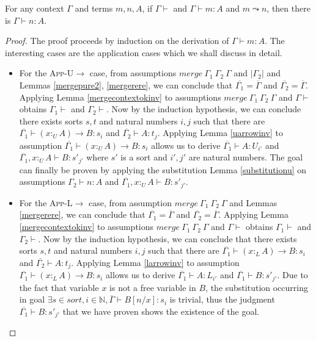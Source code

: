 \documentclass[sigplan,screen,review,anonymous]{acmart}
\newcommand{\rname}[1]{\textsc{\footnotesize #1}}
\newcommand{\pure}[1]{|#1|}
\newcommand{\utype}{:_{\scriptscriptstyle U}}
\newcommand{\ltype}{:_{\scriptscriptstyle L}}
\newcommand{\step}{\leadsto}
\newcommand{\mrg}[3]{merge\ {#1}\ {#2}\ {#3}}
\begin{document}
\begin{theorem}
  For any context $\Gamma$ and terms $m, n, A$, if $\Gamma \vdash$ and $\Gamma \vdash m : A$ and $m \step n$, then there is $\Gamma \vdash n : A$.
\end{theorem}
\begin{proof}
  The proof proceeds by induction on the derivation of $\Gamma \vdash m : A$. The interesting cases are the application cases which we shall discuss in detail.
  \begin{itemize}
    \item For the \rname{App-U$\rightarrow$} case, from assumptions $\mrg{\Gamma_1}{\Gamma_2}{\Gamma}$ and $\pure{\Gamma_2}$ and Lemmas \ref{mergepure2}, \ref{mergerere}, we can conclude that $\overline{\Gamma_1} = \overline{\Gamma}$ and $\overline{\Gamma_2} = \overline{\Gamma}$. Applying Lemma \ref{mergecontextokinv} to assumptions $\mrg{\Gamma_1}{\Gamma_2}{\Gamma}$ and $\Gamma \vdash$ obtains $\Gamma_1 \vdash$ and $\Gamma_2 \vdash$. Now by the induction hypothesis, we can conclude there exists sorts $s, t$ and natural numbers $i, j$ such that there are $\overline{\Gamma_1} \vdash (x \utype A) \rightarrow B : s_i$ and $\overline{\Gamma_2} \vdash A : t_j$. Applying Lemma \ref{uarrowinv} to assumption $\overline{\Gamma_1} \vdash (x \utype A) \rightarrow B : s_i$ allows us to derive $\overline{\Gamma_1} \vdash A : U_{i'}$ and $\overline{\Gamma_1}, x \utype A \vdash B : s'_{j'}$ where $s'$ is a sort and $i', j'$ are natural numbers. The goal can finally be proven by applying the substitution Lemma \ref{substitutionu} on assumptions $\Gamma_2 \vdash n : A$ and $\overline{\Gamma_1}, x \utype A \vdash B : s'_{j'}$.
    \item For the \rname{App-L$\rightarrow$} case, from assumption $\mrg{\Gamma_1}{\Gamma_2}{\Gamma}$ and Lemmas \ref{mergerere}, we can conclude that $\overline{\Gamma_1} = \overline{\Gamma}$ and $\overline{\Gamma_2} = \overline{\Gamma}$. Applying Lemma \ref{mergecontextokinv} to assumptions $\mrg{\Gamma_1}{\Gamma_2}{\Gamma}$ and $\Gamma \vdash$ obtains $\Gamma_1 \vdash$ and $\Gamma_2 \vdash$. Now by the induction hypothesis, we can conclude that there exists sorts $s, t$ and natural numbers $i, j$ such that there are $\overline{\Gamma_1} \vdash (x \ltype A) \rightarrow B : s_i$ and $\overline{\Gamma_2} \vdash A : t_j$. Applying Lemma \ref{larrowinv} to assumption $\overline{\Gamma_1} \vdash (x \ltype A) \rightarrow B : s_i$ allows us to derive $\overline{\Gamma_1} \vdash A : L_{i'}$ and $\overline{\Gamma_1} \vdash B : s'_{j'}$. Due to the fact that variable $x$ is not a free variable in $B$, the substitution occurring in goal $\exists s \in sort, i \in \mathbb{N}, \overline{\Gamma} \vdash B[n/x] : s_i$ is trivial, thus the judgment $\overline{\Gamma_1} \vdash B : s'_{j'}$ that we have proven shows the existence of the goal.

\end{itemize}
\end{proof}
\end{document}
